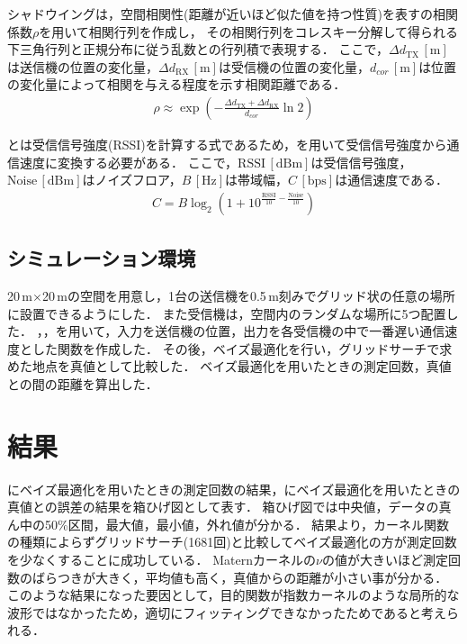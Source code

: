 \documentclass[twocolumn]{ltjarticle}
\begin{document}
シャドウイングは，空間相関性(距離が近いほど似た値を持つ性質)を表すの相関係数\(\rho\)を用いて相関行列を作成し，
その相関行列をコレスキー分解して得られる下三角行列と正規分布に従う乱数との行列積で表現する\cite{shadowing}．
ここで，\(\Delta d_{\mathrm{TX}}\,\mathrm{[m]}\)は送信機の位置の変化量，\(\Delta d_{\mathrm{RX}}\,\mathrm{[m]}\)は受信機の位置の変化量，\(d_{cor}\,\mathrm{[m]}\)は位置の変化量によって相関を与える程度を示す相関距離である．
\begin{align}
	\rho \approx \exp \left( - \frac{\Delta d_{\mathrm{TX}} + \Delta d_{\mathrm{RX}}}{d_{cor}} \ln 2 \right) \label{eq:shadowing}
\end{align}

とは受信信号強度(RSSI)を計算する式であるため，を用いて受信信号強度から通信速度に変換する必要がある．
ここで，\(\mathrm{RSSI}\,[\mathrm{dBm}]\)は受信信号強度，\(\mathrm{Noise}\,[\mathrm{dBm}]\)はノイズフロア，\(B\,[\mathrm{Hz}]\)は帯域幅，\(C\,[\mathrm{bps}]\)は通信速度である．
\begin{align}
	C = B \log_2 \left( 1 + 10^{\frac{\mathrm{RSSI}}{10}-\frac{\mathrm{Noise}}{10}} \right) \label{eq:capacity}
\end{align}
\subsection{シミュレーション環境}

20\(\,\)m\(\times\)20\(\,\)mの空間を用意し，1台の送信機を0.5\(\,\mathrm{m}\)刻みでグリッド状の任意の場所に設置できるようにした．
また受信機は，空間内のランダムな場所に5つ配置した．
，，を用いて，入力を送信機の位置，出力を各受信機の中で一番遅い通信速度とした関数を作成した．
その後，ベイズ最適化を行い，グリッドサーチで求めた地点を真値として比較した．
ベイズ最適化を用いたときの測定回数，真値との間の距離を算出した．
\section{結果}

にベイズ最適化を用いたときの測定回数の結果，にベイズ最適化を用いたときの真値との誤差の結果を箱ひげ図として表す．
箱ひげ図では中央値，データの真ん中の50\%区間，最大値，最小値，外れ値が分かる．
結果より，カーネル関数の種類によらずグリッドサーチ(1681回)と比較してベイズ最適化の方が測定回数を少なくすることに成功している．
Maternカーネルの\(\nu\)の値が大きいほど測定回数のばらつきが大きく，平均値も高く，真値からの距離が小さい事が分かる．
このような結果になった要因として，目的関数が指数カーネルのような局所的な波形ではなかったため，適切にフィッティングできなかったためであると考えられる．
\end{document}
